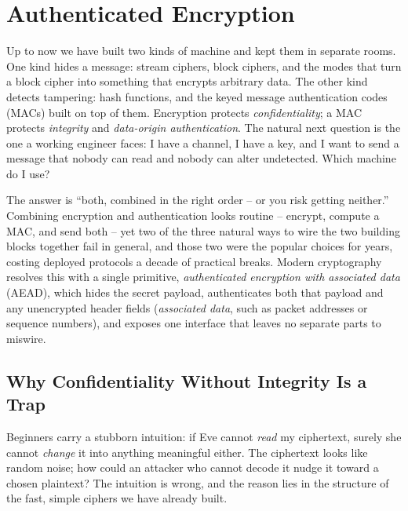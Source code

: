 \chapter{Authenticated Encryption}

Up to now we have built two kinds of machine and kept them in separate rooms. One kind hides a message: stream ciphers, block ciphers, and the modes that turn a block cipher into something that encrypts arbitrary data. The other kind detects tampering: hash functions, and the keyed message authentication codes (MACs) built on top of them. Encryption protects \emph{confidentiality}; a MAC protects \emph{integrity} and \emph{data-origin authentication}. The natural next question is the one a working engineer faces: I have a channel, I have a key, and I want to send a message that nobody can read and nobody can alter undetected. Which machine do I use?

The answer is ``both, combined in the right order -- or you risk getting neither.'' Combining encryption and authentication looks routine -- encrypt, compute a MAC, and send both -- yet two of the three natural ways to wire the two building blocks together fail in general, and those two were the popular choices for years, costing deployed protocols a decade of practical breaks. Modern cryptography resolves this with a single primitive, \emph{authenticated encryption with associated data} (AEAD), which hides the secret payload, authenticates both that payload and any unencrypted header fields (\emph{associated data}, such as packet addresses or sequence numbers), and exposes one interface that leaves no separate parts to miswire.

\chapterline

\section{Why Confidentiality Without Integrity Is a Trap}
\label{ch16:why-both}

Beginners carry a stubborn intuition: if Eve cannot \emph{read} my ciphertext, surely she cannot \emph{change} it into anything meaningful either. The ciphertext looks like random noise; how could an attacker who cannot decode it nudge it toward a chosen plaintext? The intuition is wrong, and the reason lies in the structure of the fast, simple ciphers we have already built.


